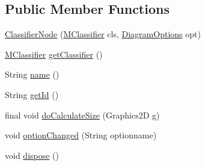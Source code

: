 \subsection*{Public Member Functions}
\begin{DoxyCompactItemize}
\item 
\hyperlink{classorg_1_1tzi_1_1use_1_1gui_1_1views_1_1diagrams_1_1classdiagram_1_1_classifier_node_a659a4cad48916d82e0da4189afd818bd}{Classifier\-Node} (\hyperlink{interfaceorg_1_1tzi_1_1use_1_1uml_1_1mm_1_1_m_classifier}{M\-Classifier} cls, \hyperlink{classorg_1_1tzi_1_1use_1_1gui_1_1views_1_1diagrams_1_1_diagram_options}{Diagram\-Options} opt)
\item 
\hyperlink{interfaceorg_1_1tzi_1_1use_1_1uml_1_1mm_1_1_m_classifier}{M\-Classifier} \hyperlink{classorg_1_1tzi_1_1use_1_1gui_1_1views_1_1diagrams_1_1classdiagram_1_1_classifier_node_a9f959899dc40b1e519a71910a7b57db3}{get\-Classifier} ()
\item 
String \hyperlink{classorg_1_1tzi_1_1use_1_1gui_1_1views_1_1diagrams_1_1classdiagram_1_1_classifier_node_a5d1e01489be8bb9a42a0185282af6405}{name} ()
\item 
String \hyperlink{classorg_1_1tzi_1_1use_1_1gui_1_1views_1_1diagrams_1_1classdiagram_1_1_classifier_node_ac31f1c21e0549b9d9cecca3cc0e8c153}{get\-Id} ()
\item 
final void \hyperlink{classorg_1_1tzi_1_1use_1_1gui_1_1views_1_1diagrams_1_1classdiagram_1_1_classifier_node_a90710fdf2ea7c3d1b1251d222888d8af}{do\-Calculate\-Size} (Graphics2\-D g)
\item 
void \hyperlink{classorg_1_1tzi_1_1use_1_1gui_1_1views_1_1diagrams_1_1classdiagram_1_1_classifier_node_a2fc8471e97082f30b47cc8f9fd899f4c}{option\-Changed} (String optionname)
\item 
void \hyperlink{classorg_1_1tzi_1_1use_1_1gui_1_1views_1_1diagrams_1_1classdiagram_1_1_classifier_node_a388ab86c7de4a3d7b2ff15577bab526e}{dispose} ()
\end{DoxyCompactItemize}
